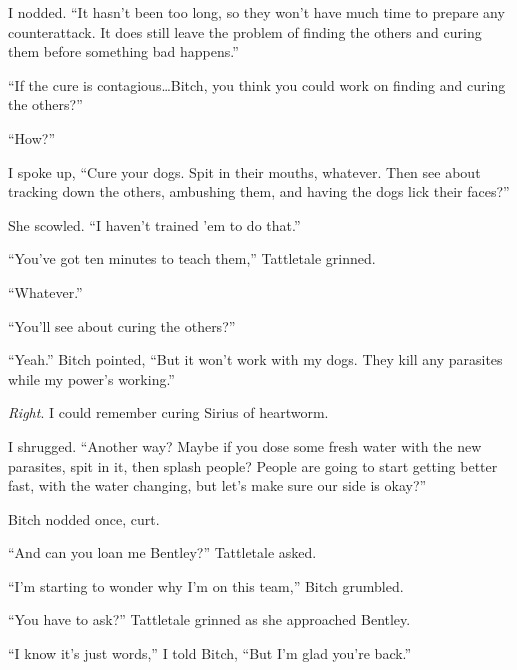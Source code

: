 I nodded.  ``It hasn't been too long, so they won't have much time to prepare any counterattack.  It does still leave the problem of finding the others and curing them before something bad happens.''



``If the cure is contagious\ldots  Bitch, you think you could work on finding and curing the others?''



``How?''



I spoke up, ``Cure your dogs.  Spit in their mouths, whatever.  Then see about tracking down the others, ambushing them, and having the dogs lick their faces?''



She scowled.  ``I haven't trained 'em to do that.''



``You've got ten minutes to teach them,'' Tattletale grinned.



``Whatever.''



``You'll see about curing the others?''



``Yeah.''  Bitch pointed, ``But it won't work with my dogs.  They kill any parasites while my power's working.''



\emph{Right}.  I could remember curing Sirius of heartworm.



I shrugged.  ``Another way?  Maybe if you dose some fresh water with the new parasites, spit in it, then splash people?  People are going to start getting better fast, with the water changing, but let's make sure our side is okay?''



Bitch nodded once, curt.



``And can you loan me Bentley?''  Tattletale asked.



``I'm starting to wonder why I'm on this team,'' Bitch grumbled.



``You have to ask?'' Tattletale grinned as she approached Bentley.



``I know it's just words,'' I told Bitch, ``But I'm glad you're back.''



